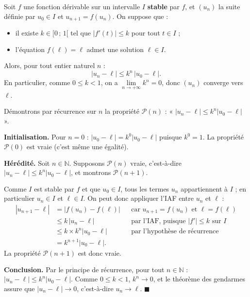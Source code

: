 \documentclass[11pt]{article}
\begin{document}
\begin{propriete}
Soit $f$ une fonction dérivable sur un intervalle $I$ \textbf{stable} par $f$, et $(u_n)$ la suite définie par $u_0 \in I$ et $u_{n+1} = f(u_n)$. On suppose que :
\begin{itemize}
\item il existe $k \in [0\,;\,1[$ tel que $|f'(t)| \leq k$ pour tout $t \in I$ ;
\item l'équation $f(\ell) = \ell$ admet une solution $\ell \in I$.
\end{itemize}
Alors, pour tout entier naturel $n$ :
\[ |u_n - \ell| \leq k^n\,|u_0 - \ell|. \]
En particulier, comme $0 \leq k < 1$, on a $\lim\limits_{n \to +\infty} k^n = 0$, donc $(u_n)$ converge vers $\ell$.
\end{propriete}

\begin{experience}
Démontrons par récurrence sur $n$ la propriété $\mathcal{P}(n)$ : « $|u_n - \ell| \leq k^n |u_0 - \ell|$ ».

\textbf{Initialisation.} Pour $n = 0$ : $|u_0 - \ell| = k^0 |u_0 - \ell|$ puisque $k^0 = 1$. La propriété $\mathcal{P}(0)$ est vraie (c'est même une égalité).

\textbf{Hérédité.} Soit $n \in \mathbb{N}$. Supposons $\mathcal{P}(n)$ vraie, c'est-à-dire $|u_n - \ell| \leq k^n |u_0 - \ell|$, et montrons $\mathcal{P}(n+1)$.

Comme $I$ est stable par $f$ et que $u_0 \in I$, tous les termes $u_n$ appartiennent à $I$ ; en particulier $u_n \in I$ et $\ell \in I$. On peut donc appliquer l'IAF entre $u_n$ et $\ell$ :
\begin{align*}
|u_{n+1} - \ell| &= |f(u_n) - f(\ell)| & &\text{car } u_{n+1} = f(u_n) \text{ et } \ell = f(\ell)\\
&\leq k\,|u_n - \ell| & &\text{par l'IAF, puisque } |f'| \leq k \text{ sur } I\\
&\leq k \times k^n |u_0 - \ell| & &\text{par l'hypothèse de récurrence}\\
&= k^{n+1} |u_0 - \ell|. & &
\end{align*}
La propriété $\mathcal{P}(n+1)$ est donc vraie.

\textbf{Conclusion.} Par le principe de récurrence, pour tout $n \in \mathbb{N}$ : $|u_n - \ell| \leq k^n |u_0 - \ell|$. Comme $0 \leq k < 1$, $k^n \to 0$, et le théorème des gendarmes assure que $|u_n - \ell| \to 0$, c'est-à-dire $u_n \to \ell$. $\blacksquare$
\end{experience}
\end{document}
